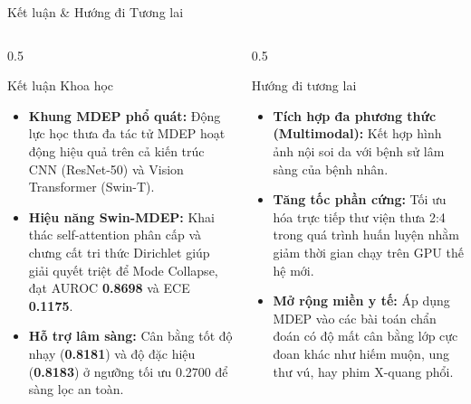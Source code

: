 \documentclass[aspectratio=169, 10pt]{beamer}
\begin{document}
\begin{frame}{Kết luận \& Hướng đi Tương lai}
  \begin{columns}
    \begin{column}{0.5\textwidth}
      \begin{block}{Kết luận Khoa học}
        \begin{itemize}
          \item \textbf{Khung MDEP phổ quát:} Động lực học thưa đa tác tử MDEP hoạt động hiệu quả trên cả kiến trúc CNN (ResNet-50) và Vision Transformer (Swin-T).
          \item \textbf{Hiệu năng Swin-MDEP:} Khai thác self-attention phân cấp và chưng cất tri thức Dirichlet giúp giải quyết triệt để Mode Collapse, đạt AUROC \textbf{0.8698} và ECE \textbf{0.1175}.
          \item \textbf{Hỗ trợ lâm sàng:} Cân bằng tốt độ nhạy (\textbf{0.8181}) và độ đặc hiệu (\textbf{0.8183}) ở ngưỡng tối ưu 0.2700 để sàng lọc an toàn.
        \end{itemize}
      \end{block}
    \end{column}
    \begin{column}{0.5\textwidth}
      \begin{exampleblock}{Hướng đi tương lai}
        \begin{itemize}
          \item \textbf{Tích hợp đa phương thức (Multimodal):} Kết hợp hình ảnh nội soi da với bệnh sử lâm sàng của bệnh nhân.
          \item \textbf{Tăng tốc phần cứng:} Tối ưu hóa trực tiếp thư viện thưa 2:4 trong quá trình huấn luyện nhằm giảm thời gian chạy trên GPU thế hệ mới.
          \item \textbf{Mở rộng miền y tế:} Áp dụng MDEP vào các bài toán chẩn đoán có độ mất cân bằng lớp cực đoan khác như hiếm muộn, ung thư vú, hay phim X-quang phổi.
        \end{itemize}
      \end{exampleblock}
    \end{column}
  \end{columns}
\end{frame}
\end{document}
